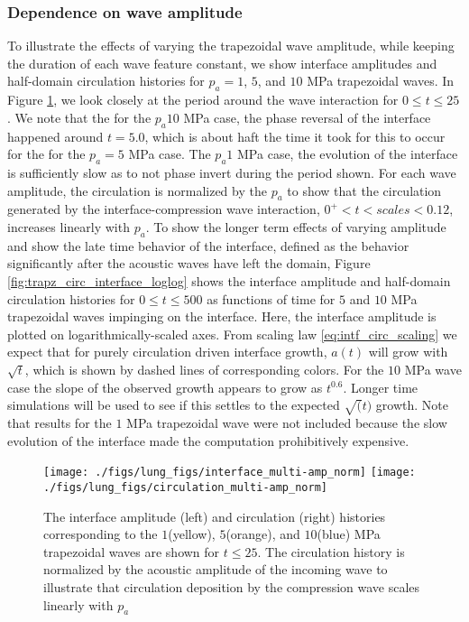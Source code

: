 \subsubsection{Dependence on wave amplitude}%
\label{subsubsec:usbe_lung_amplitude_dependence}%
To illustrate the effects of varying the trapezoidal wave amplitude,
while keeping the duration of each wave feature constant, we show
interface amplitudes and half-domain circulation histories for
$p_a=1$, $5$, and $10$ MPa trapezoidal waves. In Figure
\ref{fig:trapz_circ_interface_early}, we look closely at the period
around the wave interaction for $0 \leq t\leq 25$. We note that the
for the $p_a10$ MPa case, the phase reversal of the interface happened
around $t=5.0$, which is about haft the time it took for this to occur
for the for the $p_a=5$ MPa case. The $p_a1$ MPa case, the evolution
of the interface is sufficiently slow as to not phase invert during
the period shown. For each wave amplitude, the circulation is
normalized by the $p_a$ to show that the circulation generated by the
interface-compression wave interaction, $0^+<t<scales<0.12$, increases
linearly with $p_a$. To show the longer term effects of varying
amplitude and show the late time behavior of the interface, defined as
the behavior significantly after the acoustic waves have left the
domain, Figure \ref{fig:trapz_circ_interface_loglog} shows the
interface amplitude and half-domain circulation histories for
$0 \leq t\leq 500$ as functions of time for $5$ and $10$ MPa
trapezoidal waves impinging on the interface. Here, the interface
amplitude is plotted on logarithmically-scaled axes. From scaling law
\eqref{eq:intf_circ_scaling} we expect that for purely circulation
driven interface growth, $a(t)$ will grow with $\sqrt{t}$, which is
shown by dashed lines of corresponding colors. For the $10$ MPa wave
case the slope of the observed growth appears to grow as $t^{0.6}$.
Longer time simulations will be used to see if this settles to the
expected $\sqrt(t)$ growth. Note that results for the $1$ MPa
trapezoidal wave were not included because the slow evolution of the
interface made the computation prohibitively expensive.
%
\begin{figure}[h] 
  \centering
  \texttt{[image: ./figs/lung\_figs/interface\_multi-amp\_norm]}
  \texttt{[image: ./figs/lung\_figs/circulation\_multi-amp\_norm]}
  \caption[The interface and circulation dependence on wave amplitude at early time]{The interface amplitude (left) and circulation (right)
    histories corresponding to the $1$(yellow), $5$(orange), and
    $10$(blue) MPa trapezoidal waves are shown for $t\leq 25$. The
    circulation history is normalized by the acoustic amplitude of the
    incoming wave to illustrate that circulation deposition by the
    compression wave scales linearly with $p_a$ }
  \label{fig:trapz_circ_interface_early}
\end{figure}
